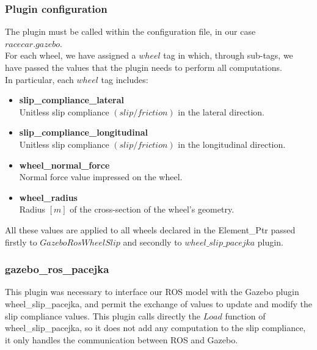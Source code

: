\subsubsection{Plugin configuration}
The plugin must be called within the configuration file, in our case $racecar.gazebo$.\\
For each wheel, we have assigned a $wheel$ tag in which, through sub-tags, we have passed the values that the plugin needs to perform all computations. \\
In particular, each $wheel$ tag includes:
\begin{itemize}
	\item \textbf{slip\_compliance\_lateral} \\
		  Unitless slip compliance $(slip / friction)$ in the lateral direction. 
	\item \textbf{slip\_compliance\_longitudinal} \\
		  Unitless slip compliance $(slip / friction)$ in the longitudinal direction. 
	\item \textbf{wheel\_normal\_force} \\
		  Normal force value impressed on the wheel.
	\item \textbf{wheel\_radius} \\
		  Radius $[m]$ of the cross-section of the wheel's geometry.
\end{itemize}
All these values are applied to all wheels declared in the Element\_Ptr passed firstly to $GazeboRosWheelSlip$ and secondly to $wheel\_slip\_pacejka$ plugin.

\subsubsection{gazebo\_ros\_pacejka}
This plugin was necessary to interface our ROS model with the Gazebo plugin wheel\_slip\_pacejka, and permit the exchange of values to update and modify the slip compliance values.
This plugin calls directly the $Load$ function of wheel\_slip\_pacejka, so it does not add any computation to the slip compliance, it only handles the communication between ROS and Gazebo.

